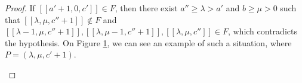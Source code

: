 \documentclass[10pt,a4paper]{amsart}
\begin{document}
\begin{proof}
     If $[[a'+1,0,c']] \in F$, then there exist $a'' \geq \lambda > a'$ and $b \geq \mu > 0$ such that $[[\lambda,\mu,c''+1]] \notin F$ and $[[\lambda-1,\mu,c''+1]], [[\lambda,\mu-1,c''+1]], [[\lambda,\mu,c'']] \in F$, which contradicts the hypothesis. On Figure \ref{fig_type_theorem_6}, we can see an example of such a situation, where $P = (\lambda,\mu,c'+1)$.  \qedhere
     


\begin{figure}[h]
    \centering
    \begin{minipage}[t]{0.48\textwidth}
        \centering
        
        \caption{}
        \label{fig_type_theorem_5}
    \end{minipage}
    \begin{minipage}[t]{0.48\textwidth}
        \centering
        
        \caption{}
        \label{fig_type_theorem_6}
    \end{minipage}
\end{figure}
\end{proof}
\end{document}
